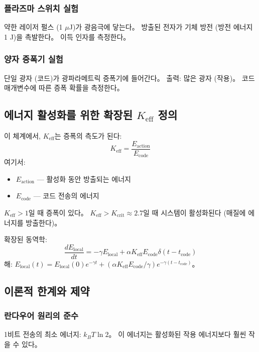 \documentclass[11pt,a4paper]{article}
\begin{document}
\subsubsection{플라즈마 스위치 실험}
약한 레이저 펄스 (1 $\mu$J)가 광음극에 닿는다。 방출된 전자가 기체 방전 (방전 에너지 1 J)을 촉발한다。 이득 인자를 측정한다。

\subsubsection{양자 증폭기 실험}
단일 광자 (코드)가 광파라메트릭 증폭기에 들어간다。 출력: 많은 광자 (작용)。 코드 매개변수에 따른 증폭 확률을 측정한다。

\subsection{에너지 활성화를 위한 확장된 $K_{\mathrm{eff}}$ 정의}

이 체계에서, $K_{\mathrm{eff}}$는 증폭의 측도가 된다:
\begin{equation}
K_{\mathrm{eff}} = \frac{E_{\text{action}}}{E_{\text{code}}}
\end{equation}
여기서:
\begin{itemize}
\item $E_{\text{action}}$ — 활성화 동안 방출되는 에너지
\item $E_{\text{code}}$ — 코드 전송의 에너지
\end{itemize}

$K_{\mathrm{eff}} > 1$일 때 증폭이 있다。 $K_{\mathrm{eff}} > K_{\text{crit}} \approx 2.7$일 때 시스템이 활성화된다 (매질에 에너지를 방출한다)。

확장된 동역학:
\begin{equation}
\frac{dE_{\text{local}}}{dt} = -\gamma E_{\text{local}} + \alpha K_{\mathrm{eff}} E_{\text{code}} \delta(t - t_{\text{code}})
\end{equation}
해: $E_{\text{local}}(t) = E_{\text{local}}(0) e^{-\gamma t} + (\alpha K_{\mathrm{eff}} E_{\text{code}}/\gamma) e^{-\gamma(t-t_{\text{code}})}$。

\subsection{이론적 한계와 제약}

\subsubsection{란다우어 원리의 준수}
1비트 전송의 최소 에너지: $k_B T \ln 2$。 이 에너지는 활성화된 작용 에너지보다 훨씬 작을 수 있다。
\end{document}
